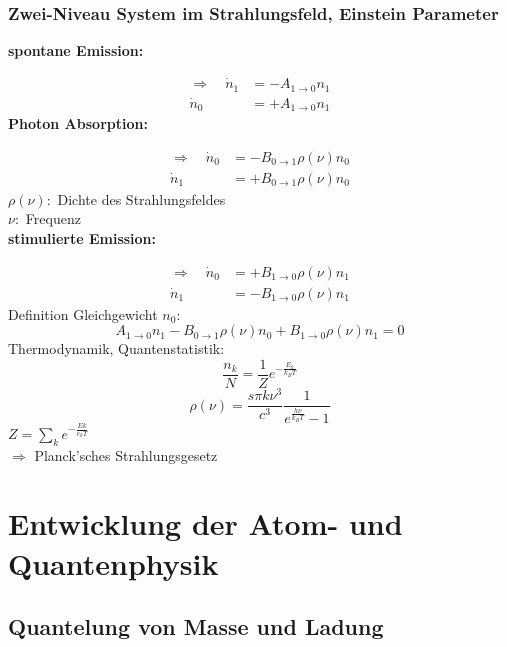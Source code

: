 \documentclass[titlepage,11pt,a4paper,ngerman]{report}
\begin{document}
\subsection{Zwei-Niveau System im Strahlungsfeld, Einstein Parameter}


\textbf{spontane Emission:}


\begin{align*}
\Rightarrow \quad \dot{n}_1 &= - A_{1 \to 0} n_1 \\
\dot{n}_0 &= + A_{1 \to 0} n_1
\end{align*}
\textbf{Photon Absorption:}


\begin{align*}
\Rightarrow \quad \dot{n}_0 &= - B_{0 \to 1} \rho(\nu) n_0 \\
\dot{n}_1 &= + B_{0 \to 1} \rho(\nu) n_0
\end{align*}
$ \rho(\nu) : $ Dichte des Strahlungsfeldes\\
$ \nu : $ Frequenz\\[5pt]
\textbf{stimulierte Emission:}


\begin{align*}
\Rightarrow \quad \dot{n}_0 &= + B_{1 \to 0} \rho(\nu) n_1 \\
\dot{n}_1 &= - B_{1 \to 0} \rho(\nu) n_1
\end{align*}
Definition Gleichgewicht
$ n_0 : $
\begin{equation*}
A_{1 \to 0} n_1 - B_{0 \to 1} \rho(\nu) n_0 + B_{1 \to 0} \rho(\nu) n_1 = 0
\end{equation*}
Thermodynamik, Quantenstatistik:
\begin{equation*}
\frac{n_k}{N} = \frac{1}{Z} e^{-\frac{E_k}{k_B T}}
\end{equation*}
\begin{equation*}
\rho(\nu) = \frac{s \pi k \nu^3}{c^3} \frac{1}{e^{\frac{h \nu}{k_B T}} - 1}
\end{equation*}
$ Z = \sum_k e^{-\frac{E k}{e_k T}} $\\[5pt]
$ \Rightarrow $ Planck'sches Strahlungsgesetz

\chapter{Entwicklung der Atom- und Quantenphysik}

\section{Quantelung von Masse und Ladung}
\end{document}
